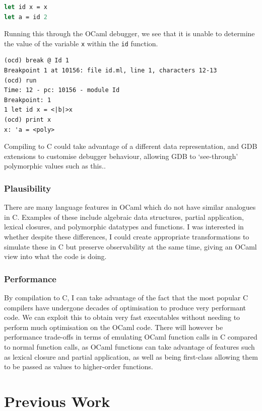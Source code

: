 \begin{lstlisting}[language=Caml]
let id x = x
let a = id 2
\end{lstlisting}

Running this through the OCaml debugger, we see that it is unable to determine
the value of the variable \texttt{x} within the \texttt{id} function.

\begin{lstlisting}
(ocd) break @ Id 1
Breakpoint 1 at 10156: file id.ml, line 1, characters 12-13
(ocd) run
Time: 12 - pc: 10156 - module Id
Breakpoint: 1
1 let id x = <|b|>x
(ocd) print x
x: 'a = <poly>
\end{lstlisting}

Compiling to C could take advantage of a different data representation, and GDB
extensions to customise debugger behaviour, allowing GDB to `see-through'
polymorphic values such as this..

\subsubsection{Plausibility} There are many language features in OCaml which do
not have similar analogues in C. Examples of these include algebraic data
structures, partial application, lexical closures, and polymorphic datatypes and
functions. I was interested in whether despite these differences, I could create
appropriate transformations to simulate these in C but preserve observability at
the same time, giving an OCaml view into what the code is doing.

\subsubsection{Performance}

By compilation to C, I can take advantage of the fact that the most popular C 
compilers have undergone decades of optimisation to produce very performant 
code. We can exploit this to obtain very fast executables without needing to 
perform much optimisation on the OCaml code. There will however be performance 
trade-offs in terms of emulating OCaml function calls in C compared to normal 
function calls, as OCaml functions can take advantage of features such as
lexical closure and partial application, as well as being first-class allowing
them to be passed as values to higher-order functions.

\section{Previous Work}


